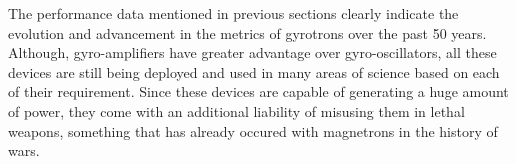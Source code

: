 The performance data mentioned in previous sections clearly indicate the evolution and advancement in the metrics of gyrotrons over the past 50 years. Although, gyro-amplifiers have greater advantage over gyro-oscillators, all these devices are still being deployed and used in many areas of science based on each of their requirement. Since these devices are capable of generating a huge amount of power, they come with an additional liability of misusing them in lethal weapons, something that has already occured with magnetrons in the history of wars.